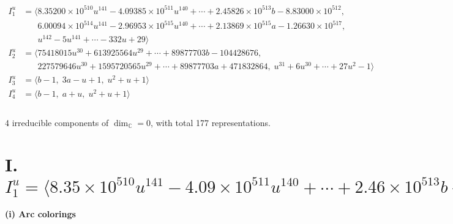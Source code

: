 \documentclass[1p]{elsarticle_modified}
\theoremstyle{definition}
\begin{document}
\begin{align*}
I^u_{1}&=\langle 
8.35200\times10^{510} u^{141}-4.09385\times10^{511} u^{140}+\cdots+2.45826\times10^{513} b-8.83000\times10^{512},\\
\phantom{I^u_{1}}&\phantom{= \langle  }6.00094\times10^{514} u^{141}-2.96953\times10^{515} u^{140}+\cdots+2.13869\times10^{515} a-1.26630\times10^{517},\\
\phantom{I^u_{1}}&\phantom{= \langle  }u^{142}-5 u^{141}+\cdots-332 u+29\rangle \\
I^u_{2}&=\langle 
75418015 u^{30}+613925564 u^{29}+\cdots+89877703 b-104428676,\\
\phantom{I^u_{2}}&\phantom{= \langle  }227579646 u^{30}+1595720565 u^{29}+\cdots+89877703 a+471832864,\;u^{31}+6 u^{30}+\cdots+27 u^2-1\rangle \\
I^u_{3}&=\langle 
b-1,\;3 a- u+1,\;u^2+u+1\rangle \\
I^u_{4}&=\langle 
b-1,\;a+u,\;u^2+u+1\rangle \\
\\
\end{align*}
\raggedright * 4 irreducible components of $\dim_{\mathbb{C}}=0$, with total 177 representations.\\
\newpage
\renewcommand{\arraystretch}{1}
\centering \section*{I. $I^u_{1}= \langle 8.35\times10^{510} u^{141}-4.09\times10^{511} u^{140}+\cdots+2.46\times10^{513} b-8.83\times10^{512},\;6.00\times10^{514} u^{141}-2.97\times10^{515} u^{140}+\cdots+2.14\times10^{515} a-1.27\times10^{517},\;u^{142}-5 u^{141}+\cdots-332 u+29 \rangle$}
\flushleft \textbf{(i) Arc colorings}\\
\end{document}
